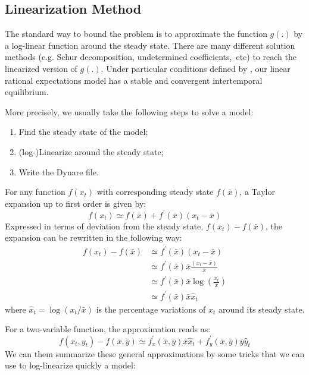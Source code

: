 \documentclass[a4paper,12pt]{article}%
\begin{document}
\subsection{Linearization Method}

The standard way to bound the problem is to approximate the function $g\left(
.\right)  $ by a log-linear function around the steady state. There are many
different solution methods (e.g. Schur decomposition, undetermined
coefficients,\ etc) to reach the linearized version of $g\left(  .\right)  .$
Under particular conditions defined by \cite{blanchard1980solution}, our
linear rational expectations model has a stable and convergent intertemporal equilibrium.

More precisely, we usually take the following steps to solve a model:

\begin{enumerate}
\item Find the steady state of the model;

\item (log-)Linearize around the steady state;

\item Write the Dynare file.
\end{enumerate}

For any function $f(x_{t})$ with corresponding steady state $f(\bar{x})$, a
Taylor expansion up to first order is given by:%
\begin{equation}
f(x_{t})\simeq f(\bar{x})+f^{\prime}(\bar{x})\left(  x_{t}-\bar{x}\right)
\end{equation}
Expressed in terms of deviation from the steady state, $f(x_{t})-f(\bar{x})$,
the expansion can be rewritten in the following way:%
\begin{align*}
f(x_{t})-f(\bar{x})  &  \simeq f^{\prime}(\bar{x})\left(  x_{t}-\bar{x}\right)
\\
&  \simeq f^{\prime}(\bar{x})\bar{x}\frac{\left(  x_{t}-\bar{x}\right)  }%
{\bar{x}}\\
&  \simeq f^{\prime}(\bar{x})\bar{x}\log(\frac{x_{t}}{\bar{x}})\\
&  \simeq f^{\prime}(\bar{x})\bar{x}\hat{x}_{t}%
\end{align*}
where $\hat{x}_{t}=\log(x_{t}/\bar{x})$ is the percentage variations of
$x_{t}$ around its steady state.

For a two-variable function, the approximation reads as:%
\begin{equation}
f(x_{t},y_{t})-f(\bar{x},\bar{y})\simeq f_{x}^{\prime}(\bar{x},\bar{y})\bar
{x}\hat{x}_{t}+f_{y}^{\prime}(\bar{x},\bar{y})\bar{y}\hat{y}_{t}%
\end{equation}
We can them summarize these general approximations by some tricks that we can
use to log-linearize quickly a model:
\end{document}
